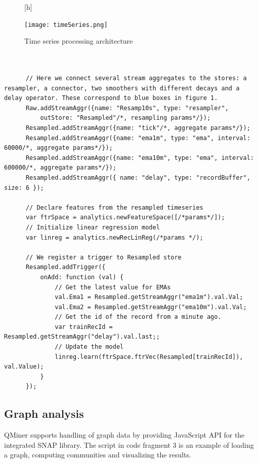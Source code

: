 \documentclass{article} %
\begin{document}
      \begin{figure}\label{timeSeries}[h]
      \begin{center}
      \texttt{[image: timeSeries.png]}
      \end{center}
      \caption{Time series processing architecture}
      \end{figure}

      \begin{lstlisting}[caption=Time series processing] 	
      
      
      // Here we connect several stream aggregates to the stores: a resampler, a connector, two smoothers with different decays and a delay operator. These correspond to blue boxes in figure 1.
      Raw.addStreamAggr({name: "Resamp10s", type: "resampler",
          outStore: "Resampled"/*, resampling params*/});
      Resampled.addStreamAggr({name: "tick"/*, aggregate params*/});
      Resampled.addStreamAggr({name: "ema1m", type: "ema", interval: 60000/*, aggregate params*/});
      Resampled.addStreamAggr({name: "ema10m", type: "ema", interval: 600000/*, aggregate params*/});
      Resampled.addStreamAggr({ name: "delay", type: "recordBuffer", size: 6 });

      // Declare features from the resampled timeseries
      var ftrSpace = analytics.newFeatureSpace([/*params*/]);
      // Initialize linear regression model
      var linreg = analytics.newRecLinReg(/*params */);
      
      // We register a trigger to Resampled store
      Resampled.addTrigger({
          onAdd: function (val) {
              // Get the latest value for EMAs
              val.Ema1 = Resampled.getStreamAggr("ema1m").val.Val;
              val.Ema2 = Resampled.getStreamAggr("ema10m").val.Val;
              // Get the id of the record from a minute ago.
              var trainRecId = Resampled.getStreamAggr("delay").val.last;;
              // Update the model
              linreg.learn(ftrSpace.ftrVec(Resampled[trainRecId]), val.Value);
          }
      });
      \end{lstlisting}


\subsection{Graph analysis}
QMiner supports handling of graph data by providing JavaScript API for the integrated SNAP library.
The script in code fragment 3 is an example of loading a graph, computing communities and visualizing the results.
\end{document}
